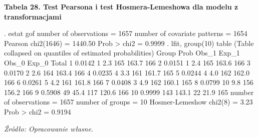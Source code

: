 \vspace{0.5cm}
\textbf{Tabela 28. Test Pearsona i test Hosmera-Lemeshowa dla modelu z transformacjami}
\begin{stlog}
. estat gof
{}
{\smallskip}
       number of observations =      1657
 number of covariate patterns =      1654
           Pearson chi2(1646) =      1440.50
                  Prob > chi2 =         0.9999
{\smallskip}
. lfit, group(10) table
{\smallskip}
{}
{\smallskip}
  (Table collapsed on quantiles of estimated probabilities)
  {\TLC}
  {\VBAR} Group {\VBAR}   Prob {\VBAR} Obs_1 {\VBAR} Exp_1 {\VBAR} Obs_0 {\VBAR} Exp_0 {\VBAR} Total {\VBAR}
  {\LFTT}
  {\VBAR}     1 {\VBAR} 0.0142 {\VBAR}     1 {\VBAR}   2.3 {\VBAR}   165 {\VBAR} 163.7 {\VBAR}   166 {\VBAR}
  {\VBAR}     2 {\VBAR} 0.0151 {\VBAR}     1 {\VBAR}   2.4 {\VBAR}   165 {\VBAR} 163.6 {\VBAR}   166 {\VBAR}
  {\VBAR}     3 {\VBAR} 0.0170 {\VBAR}     2 {\VBAR}   2.6 {\VBAR}   164 {\VBAR} 163.4 {\VBAR}   166 {\VBAR}
  {\VBAR}     4 {\VBAR} 0.0235 {\VBAR}     4 {\VBAR}   3.3 {\VBAR}   161 {\VBAR} 161.7 {\VBAR}   165 {\VBAR}
  {\VBAR}     5 {\VBAR} 0.0244 {\VBAR}     4 {\VBAR}   4.0 {\VBAR}   162 {\VBAR} 162.0 {\VBAR}   166 {\VBAR}
  {\LFTT}
  {\VBAR}     6 {\VBAR} 0.0261 {\VBAR}     5 {\VBAR}   4.2 {\VBAR}   161 {\VBAR} 161.8 {\VBAR}   166 {\VBAR}
  {\VBAR}     7 {\VBAR} 0.0408 {\VBAR}     3 {\VBAR}   4.9 {\VBAR}   162 {\VBAR} 160.1 {\VBAR}   165 {\VBAR}
  {\VBAR}     8 {\VBAR} 0.0799 {\VBAR}    10 {\VBAR}   9.8 {\VBAR}   156 {\VBAR} 156.2 {\VBAR}   166 {\VBAR}
  {\VBAR}     9 {\VBAR} 0.5908 {\VBAR}    49 {\VBAR}  45.4 {\VBAR}   117 {\VBAR} 120.6 {\VBAR}   166 {\VBAR}
  {\VBAR}    10 {\VBAR} 0.9999 {\VBAR}   143 {\VBAR} 143.1 {\VBAR}    22 {\VBAR}  21.9 {\VBAR}   165 {\VBAR}
  {\BLC}
{\smallskip}
       number of observations =      1657
             number of groups =        10
      Hosmer-Lemeshow chi2(8) =         3.23
                  Prob > chi2 =         0.9194
\end{stlog}
\textit{\footnotesize{Źródło: Opracowanie własne.}} \\

